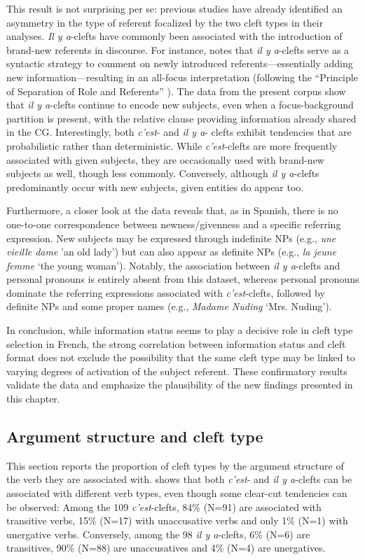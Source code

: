 This result is not surprising per se: previous studies \parencite{lambrecht1988presentational, de2015status, karssenberg2017oiseaux} have already identified an asymmetry in the type of referent focalized by the two cleft types in their analyses. \textit{Il y a}-clefts have commonly been associated with the introduction of brand-new referents in discourse. For instance, \textcite{lambrecht2000subjects} notes that \textit{il y a}-clefts serve as a syntactic strategy to comment on newly introduced referents—essentially adding new information—resulting in an all-focus interpretation (following the ``Principle of Separation of Role and Referents” \cite[185]{lambrecht1996information}). The data from the present corpus show that \textit{il y a}-clefts continue to encode new subjects, even when a focus-background partition is present, with the relative clause providing information already shared in the CG.
Interestingly, both \textit{c’est}- and \textit{il y a}- clefts exhibit tendencies that are probabilistic rather than deterministic. While \textit{c’est}-clefts are more frequently associated with given subjects, they are occasionally used with brand-new subjects as well, though less commonly. Conversely, although \textit{il y a}-clefts predominantly occur with new subjects, given entities do appear too.

Furthermore, a closer look at the data reveals that, as in Spanish, there is no one-to-one correspondence between newness/givenness and a specific referring expression. New subjects may be expressed through indefinite NPs (e.g., \textit{une vieille dame} 'an old lady') but can also appear as definite NPs (e.g., \textit{la jeune femme} `the young woman'). Notably, the association between \textit{il y a}-clefts and personal pronouns is entirely absent from this dataset, whereas personal pronouns dominate the referring expressions associated with \textit{c’est}-clefts, followed by definite NPs and some proper names (e.g., \textit{Madame Nuding} `Mrs. Nuding').

In conclusion, while information status seems to play a decisive role in cleft type selection in French, the strong correlation between information status and cleft format does not exclude the possibility that the same cleft type may be linked to varying degrees of activation of the subject referent. These confirmatory results validate the data and emphasize the plausibility of the new findings presented in this chapter.


\subsection{Argument structure and cleft type} \label{sub:6.8.3}
This section reports the proportion of cleft types by the argument structure of the verb they are associated with.  shows that both \textit{c'est}- and \textit{il y a}-clefts can be associated with different verb types, even though some clear-cut tendencies can be observed: Among the 109 \textit{c'est}-clefts, 84\% (N=91) are associated with transitive verbs, 15\% (N=17) with unaccusative verbs and only 1\% (N=1) with unergative verbs. Conversely, among the 98 \textit{il y a}-clefts, 6\% (N=6) are transitives, 90\% (N=88) are unaccusatives and 4\% (N=4) are unergatives. 

